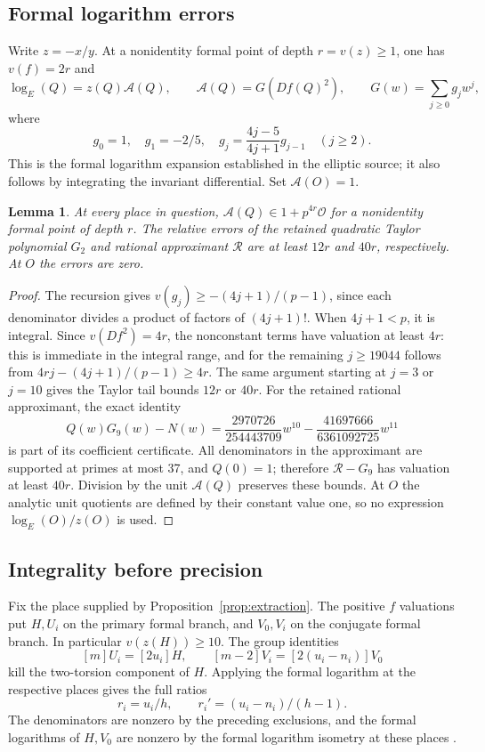 \documentclass[11pt,a4paper]{article}
\newtheorem{lemma}[theorem]{Lemma}
\theoremstyle{remark}\newtheorem{remark}[theorem]{Remark}
\begin{document}
\subsection{Formal logarithm errors}
Write $z=-x/y$. At a nonidentity formal point of depth
$r=v(z)\ge1$, one has $v(f)=2r$ and
\[
 \log_E(Q)=z(Q)\mathcal A(Q),\qquad
 \mathcal A(Q)=G(Df(Q)^2),\qquad
 G(w)=\sum_{j\ge0}g_jw^j,
\]
where
\[
 g_0=1,\quad g_1=-2/5,\quad
 g_j=\frac{4j-5}{4j+1}g_{j-1}\quad(j\ge2).
\]
This is the formal logarithm expansion established in the elliptic
source; it also follows by integrating the invariant differential.
Set $\mathcal A(O)=1$.

\begin{lemma}\label{lem:logerror}
At every place in question,
$\mathcal A(Q)\in1+p^{4r}\mathcal O$ for a nonidentity formal point
of depth $r$. The relative errors of the retained quadratic Taylor
polynomial $G_2$ and rational approximant $\mathcal R$ are at least
$12r$ and $40r$, respectively. At $O$ the errors are zero.
\end{lemma}
\begin{proof}
The recursion gives $v(g_j)\ge-(4j+1)/(p-1)$, since each denominator
divides a product of factors of $(4j+1)!$. When $4j+1<p$, it is
integral. Since $v(Df^2)=4r$, the nonconstant terms have valuation
at least $4r$: this is immediate in the integral range, and for the
remaining $j\ge19044$ follows from
$4rj-(4j+1)/(p-1)\ge4r$.
The same argument starting at $j=3$ or $j=10$ gives the Taylor tail
bounds $12r$ or $40r$.
For the retained rational approximant, the exact identity
\[
 Q(w)G_9(w)-N(w)
 =\frac{2970726}{254443709}w^{10}
 -\frac{41697666}{6361092725}w^{11}
\]
is part of its coefficient certificate. All denominators in the
approximant are supported at primes at most 37, and $Q(0)=1$;
therefore $\mathcal R-G_9$ has valuation at least $40r$.
Division by the unit $\mathcal A(Q)$ preserves these bounds.
At $O$ the analytic unit quotients are defined by their constant
value one, so no expression $\log_E(O)/z(O)$ is used.
\end{proof}

\subsection{Integrality before precision}
Fix the place supplied by Proposition~\ref{prop:extraction}. The
positive $f$ valuations put $H,U_i$ on the primary formal branch,
and $V_0,V_i$ on the conjugate formal branch. In particular
$v(z(H))\ge10$. The group identities
\[
 [m]U_i=[2u_i]H,\qquad
 [m-2]V_i=[2(u_i-n_i)]V_0
\]
kill the two-torsion component of $H$. Applying the formal logarithm
at the respective places gives the full ratios
\[
               r_i=u_i/h,\qquad r_i'=(u_i-n_i)/(h-1).
\]
The denominators are nonzero by the preceding exclusions, and the
formal logarithms of $H,V_0$ are nonzero by the formal logarithm
isometry at these places \cite[Theorem IV.6.4]{Silverman}.
\end{document}
